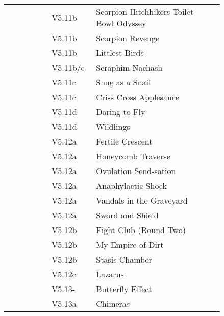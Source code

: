 \begin{flushleft}
\begin{center}
\begin{supertabular}{p{0.18\linewidth}p{0.13\linewidth}p{0.45\linewidth}p{0.08\linewidth}}
   &V5.11b&Scorpion Hitchhikers Toilet Bowl Odyssey & \pageref{rt:Scorpion Hitchhikers Toilet Bowl Odyssey} \\
  &V5.11b&Scorpion Revenge & \pageref{rt:Scorpion Revenge} \\
  &V5.11b&Littlest Birds & \pageref{rt:Littlest Birds} \\
   &V5.11b/c&Seraphim Nachash & \pageref{rt:Seraphim Nachash} \\
  &V5.11c&Snug as a Snail & \pageref{rt:Snug as a Snail} \\
  &V5.11c&Criss Cross Applesauce & \pageref{rt:Criss Cross Applesauce} \\
   &V5.11d&Daring to Fly & \pageref{rt:Daring to Fly} \\
  &V5.11d&Wildlings & \pageref{rt:Wildlings} \\
   &V5.12a&Fertile Crescent & \pageref{rt:Fertile Crescent} \\
  &V5.12a&Honeycomb Traverse & \pageref{vr:Honeycomb Traverse} \\
  &V5.12a&Ovulation Send-sation & \pageref{rt:Ovulation Send-sation} \\
 &V5.12a&Anaphylactic Shock & \pageref{rt:Anaphylactic Shock} \\
 &V5.12a&Vandals in the Graveyard & \pageref{rt:Vandals in the Graveyard} \\
&V5.12a&Sword and Shield & \pageref{rt:Sword and Shield} \\
   &V5.12b&Fight Club (Round Two) & \pageref{rt:Fight Club (Round Two)} \\
   &V5.12b&My Empire of Dirt & \pageref{rt:My Empire of Dirt} \\
  &V5.12b&Stasis Chamber & \pageref{rt:Stasis Chamber} \\
  &V5.12c&Lazarus & \pageref{vr:Lazarus} \\
&V5.13-&Butterfly Effect & \pageref{rt:Butterfly Effect} \\
&V5.13a&Chimeras & \pageref{rt:Chimeras} \\
\end{supertabular}
\end{center}
\end{flushleft}
\onecolumn
\clearpage